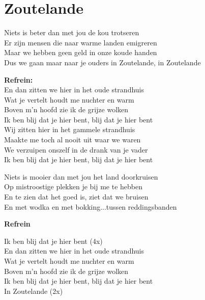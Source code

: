 \section{Zoutelande}
Niets is beter dan met jou de kou trotseren\\
Er zijn mensen die naar warme landen emigreren\\
Maar we hebben geen geld in onze koude handen\\
Dus we gaan maar naar je ouders in Zoutelande, in Zoutelande

\textbf{Refrein:}\\
En dan zitten we hier in het oude strandhuis\\
Wat je vertelt houdt me nuchter en warm\\
Boven m’n hoofd zie ik de grijze wolken\\
Ik ben blij dat je hier bent, blij dat je hier bent\\
Wij zitten hier in het gammele strandhuis\\
Maakte me toch al nooit uit waar we waren\\
We verzuipen onszelf in de drank van je vader\\
Ik ben blij dat je hier bent, blij dat je hier bent

Niets is mooier dan met jou het land doorkruisen\\
Op mistroostige plekken je bij me te hebben\\
En te zien dat het goed is, ziet dat we bruisen\\
En met wodka en met bokking...tussen reddingsbanden

\textbf{Refrein}

Ik ben blij dat je hier bent (4x)\\
En dan zitten we hier in het oude strandhuis\\
Wat je vertelt houdt me nuchter en warm\\
Boven m’n hoofd zie ik de grijze wolken\\
Ik ben blij dat je hier bent, blij dat je hier bent\\
In Zoutelande (2x)
